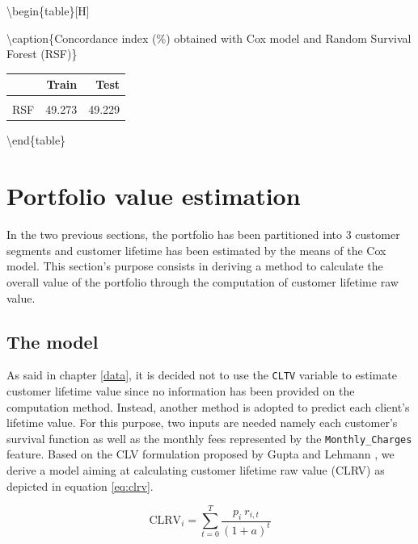 \documentclass[
]{book}
\begin{document}
\textbackslash begin\{table\}{[}H{]}

\textbackslash caption\{\label{tab:performances}Concordance index (\%) obtained with Cox model and Random Survival Forest (RSF)\}
\centering

\begin{tabular}[t]{lrr}
\toprule
  & Train & Test\\
\midrule
\cellcolor{gray!6}{Cox} & \cellcolor{gray!6}{86.769} & \cellcolor{gray!6}{86.253}\\
RSF & 49.273 & 49.229\\
\bottomrule
\end{tabular}

\textbackslash end\{table\}

\hypertarget{portfolio-value-estimation}{%
\section{Portfolio value estimation}\label{portfolio-value-estimation}}

In the two previous sections, the portfolio has been partitioned into 3 customer segments and customer lifetime has been estimated by the means of the Cox model. This section's purpose consists in deriving a method to calculate the overall value of the portfolio through the computation of customer lifetime raw value.

\hypertarget{the-model}{%
\subsection{The model}\label{the-model}}

As said in chapter \ref{data}, it is decided not to use the \texttt{CLTV} variable to estimate customer lifetime value since no information has been provided on the computation method. Instead, another method is adopted to predict each client's lifetime value. For this purpose, two inputs are needed namely each customer's survival function as well as the monthly fees represented by the \texttt{Monthly\_Charges} feature. Based on the CLV formulation proposed by Gupta and Lehmann \citep{CUSTOMERS_ASSETS}, we derive a model aiming at calculating customer lifetime raw value (CLRV) as depicted in equation \eqref{eq:clrv}.

\begin{equation}
    \text{CLRV}_i = \sum_{t=0}^{T} \frac{p_i \ r_{i,t}}{(1+a)^t} 
    \label{eq:clrv}
\end{equation}
\end{document}
